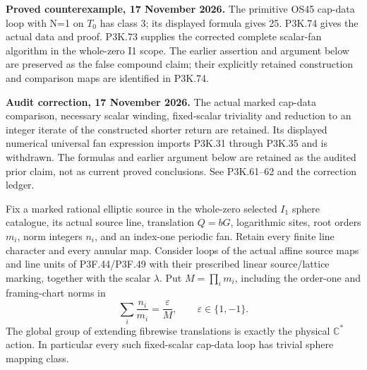 \begin{theorem}\label{night:P3K.41}
\par\noindent\textbf{Proved counterexample, 17 November 2026.} The primitive OS45 cap-data loop with N=1 on \(T_0\) has class 3; its displayed formula gives 25. P3K.74 gives the actual data and proof. P3K.73 supplies the corrected complete scalar-fan algorithm in the whole-zero I1 scope. The earlier assertion and argument below are preserved as the false compound claim; their explicitly retained construction and comparison maps are identified in P3K.74.

\par\noindent\textbf{Audit correction, 17 November 2026.} The actual marked cap-data comparison, necessary scalar winding, fixed-scalar triviality and reduction to an integer iterate of the constructed shorter return are retained. Its displayed numerical universal fan expression imports P3K.31 through P3K.35 and is withdrawn. The formulas and earlier argument below are retained as the audited prior claim, not as current proved conclusions. See P3K.61--62 and the correction ledger.
\medskip


Fix a marked rational elliptic source in the whole-zero selected
\(I_1\) sphere catalogue, its actual source line, translation
\(Q=bG\), logarithmic sites, root orders \(m_i\), norm integers
\(n_i\), and an index-one periodic fan. Retain every finite line
character and every annular map. Consider loops of the actual affine
source maps and line units of P3F.44/P3F.49 with their prescribed
linear source/lattice marking, together with the scalar \(\lambda\).
Put \(M=\prod_i m_i\), including the order-one and framing-chart
norms in
\[
           \sum_i\frac{n_i}{m_i}=\frac{\varepsilon}{M},
                \qquad\varepsilon\in\{1,-1\}.
\]
The global group of extending fibrewise translations is exactly
the physical \(\mathbb C^*\) action. In particular every such
fixed-scalar cap-data loop has trivial sphere mapping class.


\end{theorem}
